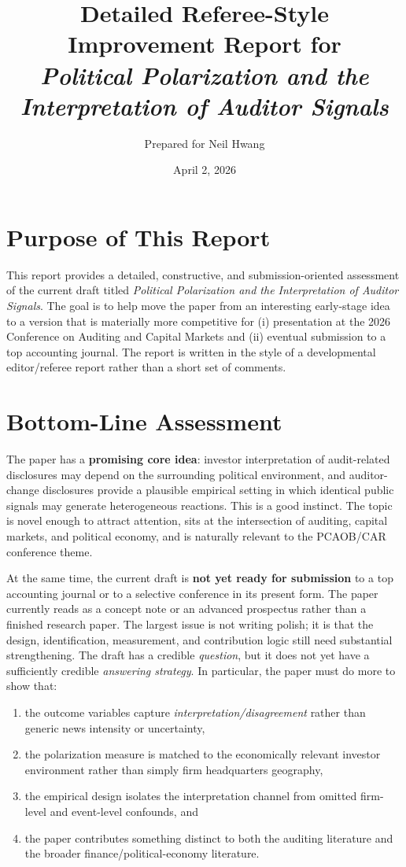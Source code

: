 \documentclass[12pt]{article}
\title{Detailed Referee-Style Improvement Report for\\
\textit{Political Polarization and the Interpretation of Auditor Signals}}
\author{Prepared for Neil Hwang}
\date{April 2, 2026}
\begin{document}
\maketitle
\onehalfspacing

\section*{Purpose of This Report}
This report provides a detailed, constructive, and submission-oriented assessment of the current draft titled \textit{Political Polarization and the Interpretation of Auditor Signals}. The goal is to help move the paper from an interesting early-stage idea to a version that is materially more competitive for (i) presentation at the 2026 Conference on Auditing and Capital Markets and (ii) eventual submission to a top accounting journal. The report is written in the style of a developmental editor/referee report rather than a short set of comments.

\section*{Bottom-Line Assessment}
The paper has a \textbf{promising core idea}: investor interpretation of audit-related disclosures may depend on the surrounding political environment, and auditor-change disclosures provide a plausible empirical setting in which identical public signals may generate heterogeneous reactions. This is a good instinct. The topic is novel enough to attract attention, sits at the intersection of auditing, capital markets, and political economy, and is naturally relevant to the PCAOB/CAR conference theme.

At the same time, the current draft is \textbf{not yet ready for submission} to a top accounting journal or to a selective conference in its present form. The paper currently reads as a concept note or an advanced prospectus rather than a finished research paper. The largest issue is not writing polish; it is that the design, identification, measurement, and contribution logic still need substantial strengthening. The draft has a credible \emph{question}, but it does not yet have a sufficiently credible \emph{answering strategy}. In particular, the paper must do more to show that:\
\begin{enumerate}[leftmargin=2em]
    \item the outcome variables capture \emph{interpretation/disagreement} rather than generic news intensity or uncertainty,
    \item the polarization measure is matched to the economically relevant investor environment rather than simply firm headquarters geography,
    \item the empirical design isolates the interpretation channel from omitted firm-level and event-level confounds, and
    \item the paper contributes something distinct to both the auditing literature and the broader finance/political-economy literature.
\end{enumerate}
\end{document}
